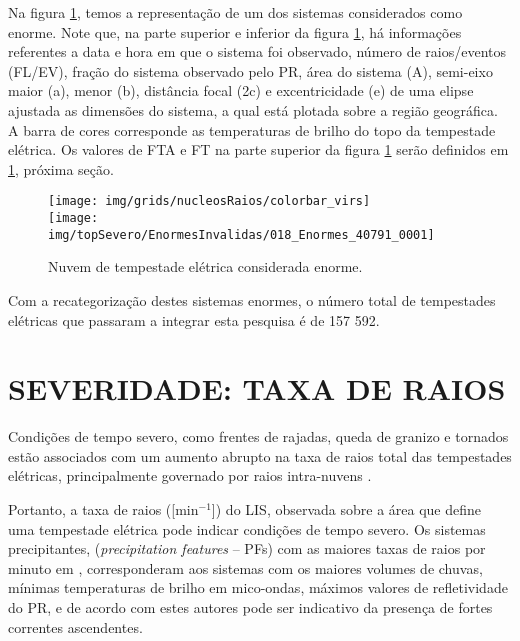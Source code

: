 Na figura \ref{nuvem221}, temos a representação de um dos sistemas considerados como enorme. Note que, na parte superior e inferior da figura \ref{nuvem221}, há informações referentes a data e hora em que o sistema foi observado, número de raios/eventos (FL/EV), fração do sistema observado pelo PR, área do sistema (A), semi-eixo maior (a), menor (b), distância focal (2c) e excentricidade (e) de uma elipse ajustada as dimensões do sistema, a qual está plotada sobre a região geográfica. A barra de cores corresponde as temperaturas de brilho do topo da tempestade elétrica. Os valores de FTA e FT na parte superior da figura \ref{nuvem221} serão definidos em \ref{metodoFtaFt}, próxima seção.

\begin{figure}[hb]
\centering
\texttt{[image: img/grids/nucleosRaios/colorbar\_virs]}\\
\texttt{[image: img/topSevero/EnormesInvalidas/018\_Enormes\_40791\_0001]}
\caption{Nuvem de tempestade elétrica considerada enorme.}  
\label{nuvem221}
\end{figure}

Com a recategorização destes sistemas enormes, o número total de tempestades elétricas que passaram a integrar esta pesquisa é de {157 592}.




\section{SEVERIDADE: TAXA DE RAIOS}
\label{metodoFtaFt}

Condições de tempo severo, como frentes de rajadas, queda de granizo e tornados estão associados com um aumento abrupto na taxa de raios total das tempestades elétricas, principalmente governado por raios intra-nuvens \cite{macgorman1989,carey1998,williams1999}.   

Portanto, a taxa de raios ([min$^{-1}$]) do LIS, observada sobre a área que define uma tempestade elétrica pode indicar condições de tempo severo. Os sistemas precipitantes, (\textit{precipitation features} -- PFs) com as maiores 
taxas de raios por minuto em , corresponderam aos sistemas com os maiores volumes de chuvas, mínimas temperaturas de brilho em mico-ondas, máximos valores de refletividade do PR, e de acordo com estes autores pode ser indicativo da presença de fortes correntes ascendentes. 

